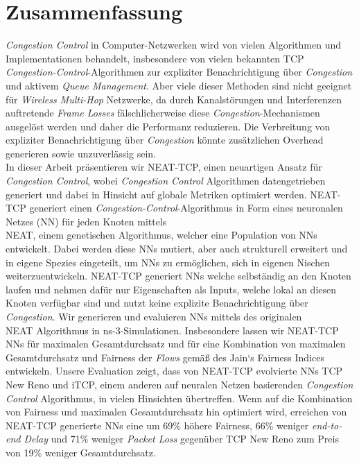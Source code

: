 \chapter*{Zusammenfassung}
\textit{Congestion Control} in Computer-Netzwerken wird von vielen Algorithmen und Implementationen behandelt, insbesondere von vielen bekannten TCP \textit{Congestion-Control}-Algorithmen zur expliziter Benachrichtigung \"uber \textit{Congestion} und aktivem \textit{Queue Management}.
Aber viele dieser Methoden sind nicht geeignet f\"ur \textit{Wireless Multi-Hop} Netzwerke, da durch Kanalst\"orungen und Interferenzen auftretende \textit{Frame Losses} f\"alschlicherweise diese \textit{Congestion}-Mechanismen ausgel\"ost werden und daher die Performanz reduzieren. Die Verbreitung von expliziter Benachrichtigung \"uber \textit{Congestion} k\"onnte zus\"atzlichen Overhead generieren sowie unzuverl\"assig sein.\\
In dieser Arbeit pr\"asentieren wir NEAT-TCP, einen neuartigen Ansatz f\"ur \textit{Congestion Control}, wobei \textit{Congestion Control} Algorithmen datengetrieben generiert und dabei in Hinsicht auf globale Metriken optimiert werden. NEAT-TCP generiert einen \textit{Congestion-Control}-Algorithmus in Form eines neuronalen Netzes (NN) f\"ur jeden Knoten mittels \\ NEAT, einem genetischen Algorithmus, welcher eine Population von NNs entwickelt. Dabei werden diese NNs mutiert, aber auch strukturell erweitert und in eigene Spezies eingeteilt, um NNs zu erm\"oglichen, sich in eigenen Nischen weiterzuentwickeln.
NEAT-TCP generiert NNs welche selbst\"andig an den Knoten laufen und nehmen daf\"ur nur Eigenschaften als Inputs, welche lokal an diesen Knoten verf\"ugbar sind und nutzt keine explizite Benachrichtigung \"uber \textit{Congestion}.
Wir generieren und evaluieren NNs mittels des originalen \\ NEAT Algorithmus in ns-3-Simulationen. Insbesondere lassen wir NEAT-TCP NNs f\"ur maximalen Gesamtdurchsatz und f\"ur eine Kombination von maximalen Gesamtdurchsatz und Fairness der \textit{Flows} gem\"a{\ss} des Jain`s Fairness Indices entwickeln. 
Unsere Evaluation zeigt, dass von NEAT-TCP evolvierte NNs TCP New Reno und iTCP, einem anderen auf neuralen Netzen basierenden \textit{Congestion Control} Algorithmus, in vielen Hinsichten \"ubertreffen. Wenn auf die Kombination von Fairness und maximalen Gesamtdurchsatz hin optimiert wird, erreichen von NEAT-TCP generierte NNs eine um 69\% h\"ohere Fairness, 66\% weniger \textit{end-to-end Delay} und 71\% weniger \textit{Packet Loss} gegen\"uber TCP New Reno zum Preis von 19\% weniger Gesamtdurchsatz.


\endgroup			

\vfill